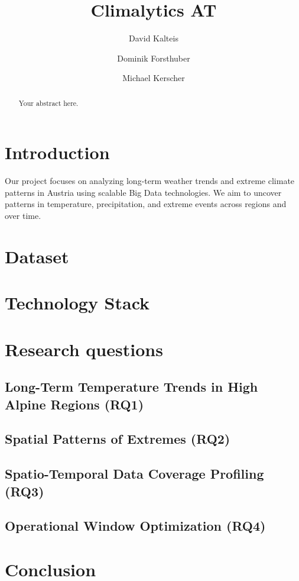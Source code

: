 \documentclass[sigconf]{acmart}
\title{Climalytics AT}
\author{David Kalteis}
\affiliation{\institution{FH Hagenberg}\department{Mobile Computing}\country{Austria}}
\author{Dominik Forsthuber}
\affiliation{\institution{FH Hagenberg}\department{Mobile Computing}\country{Austria}}
\author{Michael Kerscher}
\affiliation{\institution{FH Hagenberg}\department{Mobile Computing}\country{Austria}}
\begin{document}
\begin{abstract}
Your abstract here.
\end{abstract}

\maketitle

\section{Introduction}
Our project focuses on analyzing long-term weather trends and extreme climate patterns in Austria using scalable Big Data technologies. We aim to uncover patterns in temperature, precipitation, and extreme events across regions and over time.

\section{Dataset}


\section{Technology Stack}


\section{Research questions}
\subsection{Long-Term Temperature Trends in High Alpine Regions (RQ1)}


\subsection{Spatial Patterns of Extremes (RQ2)}


\subsection{Spatio-Temporal Data Coverage Profiling (RQ3)}


\subsection{Operational Window Optimization (RQ4)}


\section{Conclusion}



\end{document}
